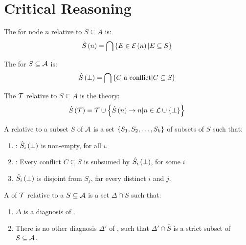 \section{Critical Reasoning}

\begin{defi}
The  for node $n$ relative to $S\subseteq A$ is:
\begin{equation}
\hat{S}\left(n\right)=\displaystyle\bigcap\left\{ E\in\mathcal{E}\left(n\right)|E\subseteq S\right\}
\end{equation}
\cite{conf/ijcai/RaimanKS93}
\end{defi}

\begin{defi}
The  for $S\subseteq\mathcal{A}$ is:
\begin{equation}
\hat{S}\left(\bot\right)=\displaystyle\bigcap\left\{ C\mbox{ a conflict}|C\subseteq S\right\}
\end{equation}
\cite{conf/ijcai/RaimanKS93}
\end{defi}

\begin{defi}
The  $\mathcal{T}$ relative to $S\subseteq A$ is the theory:
\begin{equation}
\hat{S}\left(\mathcal{T}\right)=\mathcal{T}\cup\left\{ \hat{S}\left(n\right)\rightarrow n|n\in\mathcal{L}\cup\left\{ \bot\right\}\right\}
\end{equation}
\cite{conf/ijcai/RaimanKS93}
\end{defi}

\begin{defi}
A  relative to a subset $S$ of $\mathcal{A}$ is a set $\left\{ S_1,S_2,\ldots,S_k\right\}$ of subsets of $S$ such that:
\begin{enumerate}
 \item {}: $\hat{S}_i\left(\bot\right)$ is non-empty, for all $i$.
 \item {}: Every conflict $C\subseteq S$ is subsumed by $\hat{S}_i\left(\bot\right)$, for some $i$.
 \item {} $\hat{S}_i\left(\bot\right)$ is disjoint from $S_j$, far every distinct $i$ and $j$.
\end{enumerate}
\cite{conf/ijcai/RaimanKS93}
\end{defi}

\begin{defi} A  of $\mathcal{T}$ relative to a $S\subseteq\mathcal{A}$ is a set $\Delta\cap\bar{S}$ such that:
\begin{enumerate}
 \item $\Delta$ is a diagnosis of .
 \item There is no other diagnosis $\Delta'$ of , such that $\Delta'\cap\bar{S}$ is a strict subset of $S\subseteq\mathcal{A}$.
\end{enumerate}
\cite{conf/ijcai/RaimanKS93}
\end{defi}

